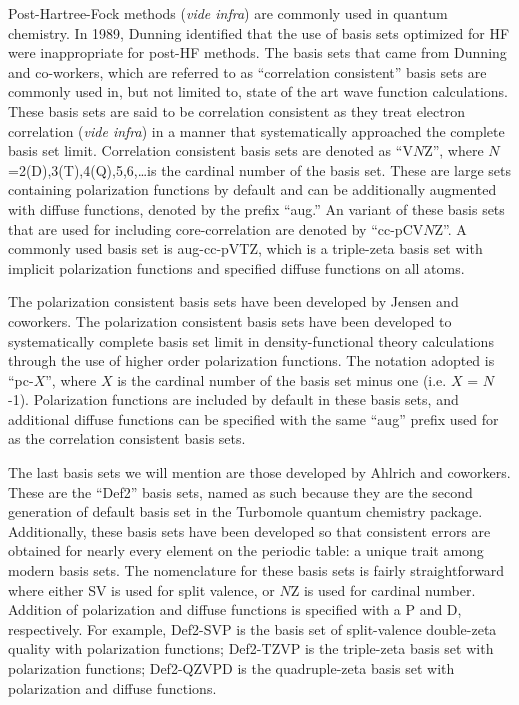 Post-Hartree-Fock methods (\emph{vide infra}) are commonly used in quantum
chemistry. In 1989, Dunning\cite{Dunning1989, Kendall1992, Woon1994} identified
that the use of basis sets optimized for HF were inappropriate for post-HF
methods. The basis sets that came from Dunning and co-workers, which are
referred to as ``correlation consistent'' basis sets are commonly used in, but
not limited to, state of the art wave function calculations. These basis sets
are said to be correlation consistent as they treat electron correlation
(\emph{vide infra}) in a manner that systematically approached the complete
basis set limit. Correlation consistent basis sets are denoted as ``V$N$Z'',
where $N$=2(D),3(T),4(Q),5,6,\ldots is the cardinal number of the basis set.
These are large sets containing polarization functions by default and can be
additionally augmented with diffuse functions, denoted by the prefix ``aug.'' An
variant of these basis sets that are used for including core-correlation are
denoted by ``cc-pCV$N$Z''.\cite{Peterson2002} A commonly used basis set is
aug-cc-pVTZ, which is a triple-zeta basis set with implicit polarization
functions and specified diffuse functions on all atoms.

\vspace{3mm}
\vspace{1mm}

The polarization consistent basis sets have been developed by Jensen and
coworkers.\cite{Jensen2001, Jensen2002, Jensen2002a, Jensen2003} The
polarization consistent basis sets have been developed to systematically
complete basis set limit in density-functional theory calculations through the
use of higher order polarization functions. The notation adopted is ``pc-$X$'',
where $X$ is the cardinal number of the basis set minus one (i.e. $X$ = $N$-1).
Polarization functions are included by default in these basis sets, and
additional diffuse functions can be specified with the same ``aug'' prefix used
for as the correlation consistent basis sets.

\vspace{3mm}
\vspace{1mm}

The last basis sets we will mention are those developed by Ahlrich and
coworkers.\cite{Schafer1992, Weigend2005} These are the ``Def2'' basis sets,
named as such because they are the second generation of default basis set in
the Turbomole quantum chemistry package.\cite{turbomole} Additionally, these
basis sets have been developed so that consistent errors are obtained for
nearly every element on the periodic table: a unique trait among modern basis
sets. The nomenclature for these basis sets is fairly straightforward where
either SV is used for split valence, or $N$Z is used for cardinal number.
Addition of polarization and diffuse functions is specified with a P and D,
respectively. For example, Def2-SVP is the basis set of split-valence
double-zeta quality with polarization functions; Def2-TZVP is the triple-zeta
basis set with polarization functions; Def2-QZVPD is the quadruple-zeta basis
set with polarization and diffuse functions.

